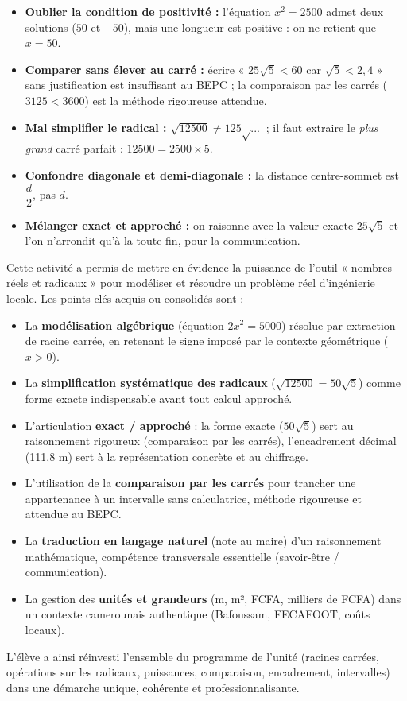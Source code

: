 \documentclass[11pt]{article}
\newcounter{popsec}
\newcounter{popsub}
\newcommand{\courssub}[1]{%
  \stepcounter{popsub}%
  \par\vspace{9pt}\noindent{\popxbold\fontsize{11.5}{13}\selectfont\color{popink}{\color{poporange}\thepopsec.\thepopsub}\hspace{6pt}#1}\par\nopagebreak\vspace{4pt}
}
\begin{document}
\begin{attention}
\begin{itemize}
    \item \textbf{Oublier la condition de positivité :} l'équation $x^2 = 2500$ admet deux solutions ($50$ et $-50$), mais une longueur est positive : on ne retient que $x = 50$.
    \item \textbf{Comparer sans élever au carré :} écrire « $25\sqrt{5} < 60$ car $\sqrt{5} < 2,4$ » sans justification est insuffisant au BEPC ; la comparaison par les carrés ($3125 < 3600$) est la méthode rigoureuse attendue.
    \item \textbf{Mal simplifier le radical :} $\sqrt{12500} \neq 125\sqrt{...}$ ; il faut extraire le \emph{plus grand} carré parfait : $12500 = 2500 \times 5$.
    \item \textbf{Confondre diagonale et demi-diagonale :} la distance centre-sommet est $\dfrac{d}{2}$, pas $d$.
    \item \textbf{Mélanger exact et approché :} on raisonne avec la valeur exacte $25\sqrt{5}$ et l'on n'arrondit qu'à la toute fin, pour la communication.
\end{itemize}
\end{attention}

\courssub{Bilan de l'activité}
Cette activité a permis de mettre en évidence la puissance de l'outil « nombres réels et radicaux » pour modéliser et résoudre un problème réel d'ingénierie locale. Les points clés acquis ou consolidés sont :
\begin{itemize}
    \item La \textbf{modélisation algébrique} (équation $2x^2=5000$) résolue par extraction de racine carrée, en retenant le signe imposé par le contexte géométrique ($x > 0$).
    \item La \textbf{simplification systématique des radicaux} ($\sqrt{12500}=50\sqrt{5}$) comme forme exacte indispensable avant tout calcul approché.
    \item L'articulation \textbf{exact / approché} : la forme exacte ($50\sqrt{5}$) sert au raisonnement rigoureux (comparaison par les carrés), l'encadrement décimal (111,8 m) sert à la représentation concrète et au chiffrage.
    \item L'utilisation de la \textbf{comparaison par les carrés} pour trancher une appartenance à un intervalle sans calculatrice, méthode rigoureuse et attendue au BEPC.
    \item La \textbf{traduction en langage naturel} (note au maire) d'un raisonnement mathématique, compétence transversale essentielle (savoir-être / communication).
    \item La gestion des \textbf{unités et grandeurs} (m, m², FCFA, milliers de FCFA) dans un contexte camerounais authentique (Bafoussam, FECAFOOT, coûts locaux).
\end{itemize}
L'élève a ainsi réinvesti l'ensemble du programme de l'unité (racines carrées, opérations sur les radicaux, puissances, comparaison, encadrement, intervalles) dans une démarche unique, cohérente et professionnalisante.
\end{document}
